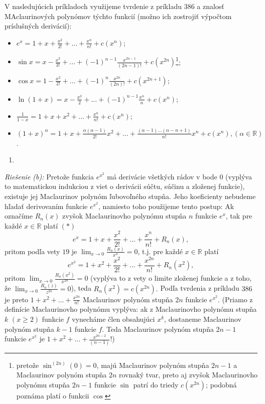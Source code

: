 V nasledujúcich príkladoch využijeme tvrdenie z príkladu $386$ a znalosť MAclaurinových polynómov týchto funkcií (možno ich zostrojiť výpočtom príslušných derivácií):
\begin{itemize}
\item $e^x=1+x+\frac{x^2}{2!}+...+\frac{x^n}{n!}+c(x^n)$;
\item $\sin x=x-\frac{x^3}{3!}+...+(-1)^{n-1}\frac{x^{2n-1}}{(2n-1)!}+c(x^{2n})$\footnote{pretože $\sin^{(2n)}(0)=0$, majú Maclaurinov polynóm stupňa $2n-1$ a Maclaurinov polynóm stupňa $2n$ rovnaký tvar, preto aj zvyšok Maclaurinovho polynómu stupňa $2n-1$ funkcie $\sin$ patrí do triedy $c(x^{2n})$; podobná poznáma platí o funkcii $\cos$};
\item $\cos x=1-\frac{x^2}{2!}+...+(-1)^{n}\frac{x^{2n}}{(2n)!}+c(x^{2n+1})$;
\item $\ln (1+x)=x-\frac{x^2}{2}+...+(-1)^{n-1}\frac{x^n}{n}+c(x^n)$;
\item $\frac{1}{1-x}=1+x+x^2+...+\frac{x^n}{n!}+c(x^n)$;
\item $(1+x)^{\alpha}=1+x+\frac{\alpha(\alpha-1)}{2!}x^2+...+\frac{(\alpha-1)...(\alpha-n+1)}{n!}x^n+c(x^n),(\alpha\in\mathbb{R})$.
\end{itemize}

\begin{enumerate}[resume]
	\item {}
\end{enumerate}

\textit{Riešenie (b):}
Pretože funkcia $e^{x^2}$ má derivácie všetkých rádov v bode $0$ (vyplýva to matematickou indukciou z viet o derivácii súčtu, súčinu a zloženej funkcie), existuje jej Maclaurinov polynóm ľubovoľného stupňa. Jeho koeficienty nebudeme hľadať derivovaním funkcie $e^{x^2}$, namiesto toho použijeme tento postup:
Ak označíme $R_n(x)$ zvyšok Maclaurinovho polynómu stupňa $n$ funkcie $e^x$, tak pre každé $x\in\mathbb{R}$ platí $(*)$
$$e^x=1+x+\frac{x^2}{2!}+...+\frac{x^n}{n!}+R_n(x),$$ 
pritom podľa vety $19$ je $\lim_{x\rightarrow 0}\frac{R_n(x)}{x^n}=0$, t.j. pre každé $x\in\mathbb{R}$ platí 
$$e^{x^2}=1+x^2+\frac{x^2}{2!}+...+\frac{x^{2n}}{n!}+R_n(x^2),$$
pritom $\lim_{x\rightarrow 0}\frac{R_n(x^2)}{x^{2n}}=0$ (vyplýva to z vety o limite zloženej funkcie a z toho, že $\lim_{x\rightarrow 0}\frac{R_n(z)}{z^{2n}}=0$), teda $R_n(x^2)=c(x^{2n}).$ Podľa tvrdenia z príkladu $386$ je preto $1+x^2+...+\frac{x^{2n}}{n!}$ Maclaurinov polynóm stupňa $2n$ funkcie $e^{x^2}$.
(Priamo z definície Maclaurinovho polynómu vyplýva: ak z Maclaurinovho polynómu stupňa $k$ $(x\geq 2)$ funkcie $f$ vynecháme člen obsahujúci $x^k$, dostaneme Maclaurinov polynóm stupňa $k-1$ funkcie $f$. Teda Maclaurinov polynóm stupňa $2n-1$ funkcie $e^{x^2}$ je $1+x^2+...+\frac{x^{2n-2}}{(n-1)}$!)

